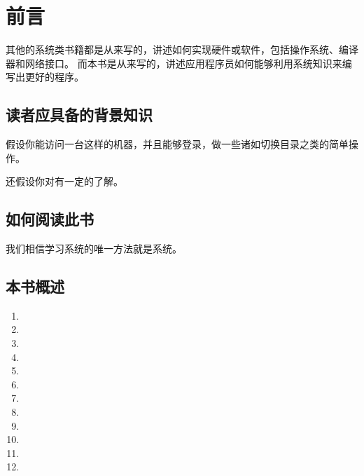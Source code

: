 
\chapter{前言}
{
    其他的系统类书籍都是从来写的，讲述如何实现硬件或软件，包括操作系统、编译器和网络接口。
    而本书是从来写的，讲述应用程序员如何能够利用系统知识来编写出更好的程序。

    \section{读者应具备的背景知识}
    {
        假设你能访问一台这样的机器，并且能够登录，做一些诸如切换目录之类的简单操作。

        还假设你对有一定的了解。
    }

    \section{如何阅读此书}
    {
        我们相信学习系统的唯一方法就是系统。
    }

    \section{本书概述}
    {
        \begin{enumerate}[第1章：]
            \item {}
            \item {}
            \item {}
            \item {}
            \item {}
            \item {}
            \item {}
            \item {}
            \item {}
            \item {}
            \item {}
            \item {}
        \end{enumerate}
    }
}

\cleardoublepage

\endinput
